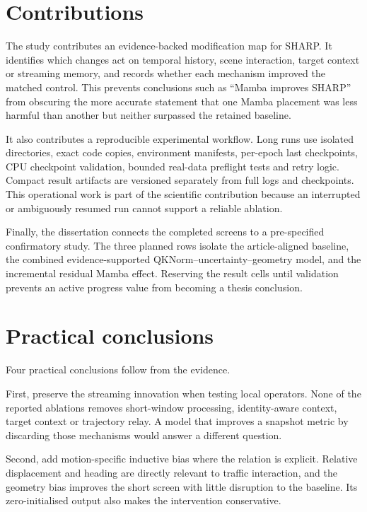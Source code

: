 \section{Contributions}

The study contributes an evidence-backed modification map for SHARP. It identifies which changes act on temporal history, scene interaction, target context or streaming memory, and records whether each mechanism improved the matched control. This prevents conclusions such as ``Mamba improves SHARP'' from obscuring the more accurate statement that one Mamba placement was less harmful than another but neither surpassed the retained baseline.

It also contributes a reproducible experimental workflow. Long runs use isolated directories, exact code copies, environment manifests, per-epoch last checkpoints, CPU checkpoint validation, bounded real-data preflight tests and retry logic. Compact result artifacts are versioned separately from full logs and checkpoints. This operational work is part of the scientific contribution because an interrupted or ambiguously resumed run cannot support a reliable ablation.

Finally, the dissertation connects the completed screens to a pre-specified confirmatory study. The three planned rows isolate the article-aligned baseline, the combined evidence-supported QKNorm--uncertainty--geometry model, and the incremental residual Mamba effect. Reserving the result cells until validation prevents an active progress value from becoming a thesis conclusion.

\section{Practical conclusions}

Four practical conclusions follow from the evidence.

First, preserve the streaming innovation when testing local operators. None of the reported ablations removes short-window processing, identity-aware context, target context or trajectory relay. A model that improves a snapshot metric by discarding those mechanisms would answer a different question.

Second, add motion-specific inductive bias where the relation is explicit. Relative displacement and heading are directly relevant to traffic interaction, and the geometry bias improves the short screen with little disruption to the baseline. Its zero-initialised output also makes the intervention conservative.

